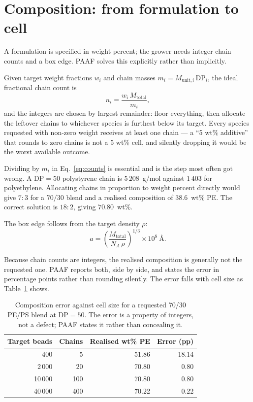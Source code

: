 \documentclass[11pt,a4paper]{article}
\begin{document}
\section{Composition: from formulation to cell}
\label{sec:composition}

A formulation is specified in weight percent; the grower needs integer chain
counts and a box edge. PAAF solves this explicitly rather than implicitly.

Given target weight fractions $w_i$ and chain masses
$m_i = M_{\text{unit},i}\,\mathrm{DP}_i$, the ideal fractional chain count is
\begin{equation}
  n_i = \frac{w_i\, M_{\text{total}}}{m_i} ,
  \label{eq:counts}
\end{equation}
and the integers are chosen by largest remainder: floor everything, then
allocate the leftover chains to whichever species is furthest below its
target. Every species requested with non-zero weight receives at least one
chain --- a ``5 wt\% additive'' that rounds to zero chains is not a 5 wt\%
cell, and silently dropping it would be the worst available outcome.

Dividing by $m_i$ in Eq.~\eqref{eq:counts} is essential and is the step most
often got wrong. A $\mathrm{DP}=50$ polystyrene chain is $5\,208$~g/mol
against $1\,403$ for polyethylene. Allocating chains in proportion to weight
percent directly would give $7:3$ for a $70/30$ blend and a realised
composition of $38.6$~wt\% PE. The correct solution is $18:2$, giving
$70.80$~wt\%.

The box edge follows from the target density $\rho$:
\begin{equation}
  a = \left(\frac{M_{\text{total}}}{N_A\,\rho}\right)^{1/3} \times 10^{8}\ \text{\AA} .
  \label{eq:box}
\end{equation}

Because chain counts are integers, the realised composition is generally not
the requested one. PAAF reports both, side by side, and states the error in
percentage points rather than rounding silently. The error falls with cell
size as Table~\ref{tab:comp} shows.

\begin{table}[t]
\centering
\small
\begin{tabular}{rrrr}
\toprule
Target beads & Chains & Realised wt\% PE & Error (pp) \\
\midrule
400    & 5   & 51.86 & 18.14 \\
2\,000  & 20  & 70.80 & 0.80 \\
10\,000 & 100 & 70.80 & 0.80 \\
40\,000 & 400 & 70.22 & 0.22 \\
\bottomrule
\end{tabular}
\caption{Composition error against cell size for a requested 70/30 PE/PS blend
at $\mathrm{DP}=50$. The error is a property of integers, not a defect;
PAAF states it rather than concealing it.}
\label{tab:comp}
\end{table}
\end{document}
